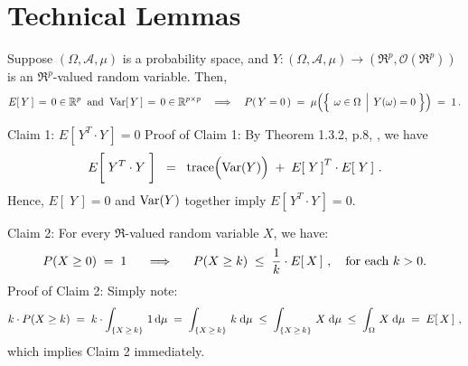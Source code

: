 

\section{Technical Lemmas}
\setcounter{theorem}{0}
\setcounter{equation}{0}

\renewcommand{\theenumi}{\roman{enumi}}
\renewcommand{\labelenumi}{\textnormal{(\theenumi)}$\;\;$}

\begin{lemma}
\mbox{}\vskip 0.2cm
\noindent
Suppose $(\Omega,\mathcal{A},\mu)$ is a probability space, and
$Y : (\Omega,\mathcal{A},\mu) \longrightarrow (\Re^{p},\mathcal{O}(\Re^{p}))$
is an $\Re^{p}$-valued random variable.
Then,
\begin{equation*}
E\!\left[\,Y\,\right] \,=\, 0 \in \Re^{p}
\;\;\textnormal{and}\;\;
\Var\!\left[\,Y\,\right] \,=\, 0 \in \Re^{p \times p}
\quad\Longrightarrow\quad
P\!\left(\,Y\overset{{\color{white}.}}{=}0\,\right)
\;=\;
	\mu\!\left(\left\{\;\left.\omega\overset{{\color{white}.}}{\in}\Omega\,\;\right\vert\;Y(\omega) = 0\;\right\}\right)
\;=\;
	1\,.
\end{equation*}
\end{lemma}
\proof
\vskip 0.3cm
\noindent
\textnormal{Claim 1:}\quad
$E\!\left[\,Y^{T}\cdot Y\,\right] = 0$
\vskip 0.3cm
\noindent
Proof of Claim 1:\quad
By Theorem 1.3.2, p.8, \cite{Christensen2011}, we have
\begin{equation*}
E\!\left[\;Y^{T} \overset{{\color{white}\vert}}{\cdot} Y\;\right]
\;\; = \;\;
	\trace\!\left(\Var(\overset{{\color{white}.}}{Y})\right)
	\; + \;
	E\!\left[\;Y\,\right]^{T} \cdot E\!\left[\;Y\,\right]\,.
\end{equation*}
Hence, $E\!\left[\;Y\,\right] = 0$ and $\textnormal{Var}(Y)$ together imply $E\!\left[\,Y^{T}\cdot Y\,\right] = 0$.

\vskip 0.5cm
\noindent
\textnormal{Claim 2:}\quad
For every $\Re$-valued random variable $X$, we have:
\begin{equation*}
P(X \geq 0) \;=\; 1
\quad\;\;\Longrightarrow\quad\;\;
P(X \geq k) \;\leq\; \dfrac{1}{k}\cdot E\!\left[\,X\,\right]\,,
\quad
\textnormal{for each $k > 0$}.
\end{equation*}
Proof of Claim 2:\quad
Simply note:
\begin{equation*}
k \cdot P(X \geq k)
\;=\; k\cdot\int_{\{X\,\geq\,k\}}\,1\,\textnormal{d}\mu
\;=\; \int_{\{X\,\geq\,k\}}\,k\;\textnormal{d}\mu
\;\leq\; \int_{\{X\,\geq\,k\}}\,X\;\textnormal{d}\mu
\;\leq\; \int_{\Omega}\,X\;\textnormal{d}\mu
\;=\; E\!\left[\,X\,\right]\,,
\end{equation*}
which implies Claim 2 immediately.

